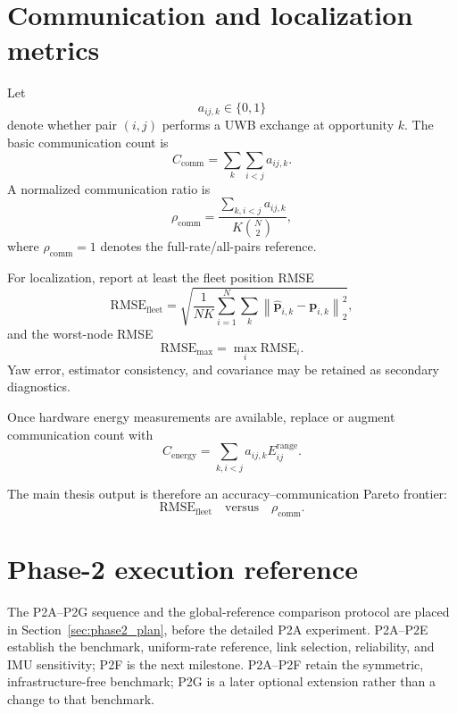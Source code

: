 \section{Communication and localization metrics}
Let
\begin{equation}
    a_{ij,k}\in\{0,1\}
\end{equation}
denote whether pair \((i,j)\) performs a UWB exchange at opportunity \(k\). The basic communication count is
\begin{equation}
    C_{\mathrm{comm}}
    =
    \sum_k\sum_{i<j}a_{ij,k}.
\end{equation}
A normalized communication ratio is
\begin{equation}
    \rho_{\mathrm{comm}}
    =
    \frac{\sum_{k,i<j}a_{ij,k}}
         {K\binom{N}{2}},
\end{equation}
where \(\rho_{\mathrm{comm}}=1\) denotes the full-rate/all-pairs reference.

For localization, report at least the fleet position RMSE
\begin{equation}
    \mathrm{RMSE}_{\mathrm{fleet}}
    =
    \sqrt{
        \frac{1}{NK}
        \sum_{i=1}^{N}\sum_k
        \left\|\hat{\bm{p}}_{i,k}-\bm{p}_{i,k}\right\|_2^2
    },
\end{equation}
and the worst-node RMSE
\begin{equation}
    \mathrm{RMSE}_{\max}
    =
    \max_i \mathrm{RMSE}_i.
\end{equation}
Yaw error, estimator consistency, and covariance may be retained as secondary diagnostics.

Once hardware energy measurements are available, replace or augment communication count with
\begin{equation}
    C_{\mathrm{energy}}
    =
    \sum_{k,i<j}a_{ij,k}E_{ij}^{\mathrm{range}}.
\end{equation}

The main thesis output is therefore an accuracy--communication Pareto frontier:
\begin{equation}
    \boxed{
    \mathrm{RMSE}_{\mathrm{fleet}}
    \quad\text{versus}\quad
    \rho_{\mathrm{comm}}
    }.
\end{equation}

\section{Phase-2 execution reference}
The P2A--P2G sequence and the global-reference comparison protocol are placed in Section~\ref{sec:phase2_plan}, before the detailed P2A experiment. P2A--P2E establish the benchmark, uniform-rate reference, link selection, reliability, and IMU sensitivity; P2F is the next milestone. P2A--P2F retain the symmetric, infrastructure-free benchmark; P2G is a later optional extension rather than a change to that benchmark.

